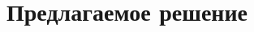 \section{Предлагаемое решение}

\begin{frame}
\frametitle{\insertsection} 
\framesubtitle{\insertsubsection}
\end{frame}